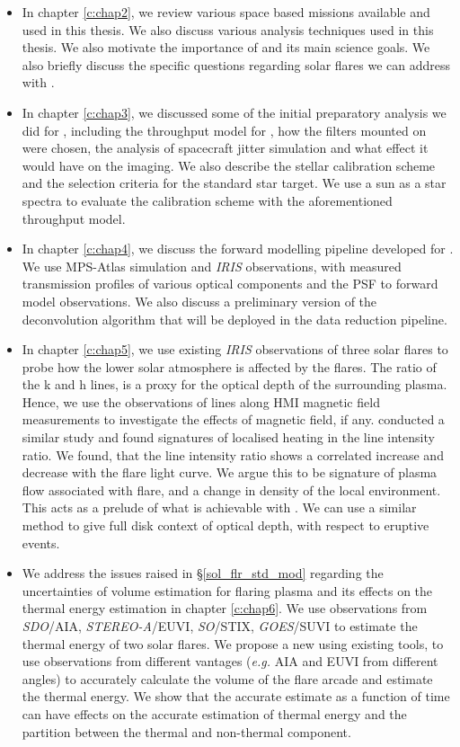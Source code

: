 \begin{itemize}
    \item In chapter \ref{c:chap2}, we review various space based missions available and used in this thesis. We also discuss various analysis techniques used in this thesis. We also motivate the importance of {\suit} and its main science goals. We also briefly discuss the specific questions regarding solar flares we can address with {\suit}.
    \item In chapter \ref{c:chap3}, we discussed some of the initial preparatory analysis we did for {\suit}, including the throughput model for {\suit}, how the filters mounted on {\suit} were chosen, the analysis of spacecraft jitter simulation and what effect it would have on the imaging. We also describe the stellar calibration scheme and the selection criteria for the standard star target. We use a sun as a star spectra to evaluate the calibration scheme with the aforementioned throughput model.
    \item In chapter \ref{c:chap4}, we discuss the forward modelling pipeline developed for {\suit}. We use MPS-Atlas simulation and {\it IRIS} observations, with measured transmission profiles of various optical components and the PSF to forward model {\suit} observations. We also discuss a preliminary version of the deconvolution algorithm that will be deployed in the data reduction pipeline.
    \item In chapter \ref{c:chap5}, we use existing {\it IRIS} observations of three solar flares to probe how the lower solar atmosphere is affected by the flares. The ratio of the  k and h lines, is a proxy for the optical depth of the surrounding plasma. Hence, we use the observations of  lines along HMI magnetic field measurements to investigate the effects of magnetic field, if any. \cite{kerr15} conducted a similar study and found signatures of localised heating in the line intensity ratio. We found, that the line intensity ratio shows a correlated increase and decrease with the flare light curve. We argue this to be signature of plasma flow associated with flare, and a change in density of the local environment. This acts as a prelude of what is achievable with {\suit}. We can use a similar method to give full disk context of optical depth, with respect to eruptive events.
    \item We address the issues raised in \S\ref{sol_flr_std_mod} regarding the uncertainties of volume estimation for flaring plasma and its effects on the thermal energy estimation in chapter \ref{c:chap6}. We use observations from {\it SDO}/AIA, {\it STEREO-A}/EUVI, {\it SO}/STIX, {\it GOES}/SUVI to estimate the thermal energy of two solar flares. We propose a new  using existing tools, to use observations from different vantages ({\it e.g.} AIA and EUVI from different angles) to accurately calculate the volume of the flare arcade and estimate the thermal energy. We show that the accurate estimate as a function of time can have effects on the accurate estimation of thermal energy and the partition between the thermal and non-thermal component.
\end{itemize}
